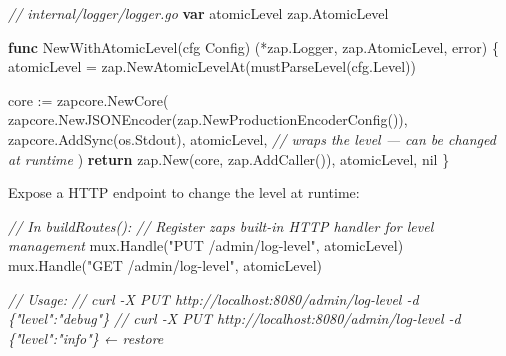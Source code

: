 \documentclass[
]{article}
\newenvironment{Shaded}{}{}
\newcommand{\CommentTok}[1]{\textcolor[rgb]{0.38,0.63,0.69}{\textit{#1}}}
\newcommand{\ControlFlowTok}[1]{\textcolor[rgb]{0.00,0.44,0.13}{\textbf{#1}}}
\newcommand{\DataTypeTok}[1]{\textcolor[rgb]{0.56,0.13,0.00}{#1}}
\newcommand{\KeywordTok}[1]{\textcolor[rgb]{0.00,0.44,0.13}{\textbf{#1}}}
\newcommand{\NormalTok}[1]{#1}
\newcommand{\OperatorTok}[1]{\textcolor[rgb]{0.40,0.40,0.40}{#1}}
\newcommand{\OtherTok}[1]{\textcolor[rgb]{0.00,0.44,0.13}{#1}}
\newcommand{\StringTok}[1]{\textcolor[rgb]{0.25,0.44,0.63}{#1}}
\begin{document}
\begin{Shaded}
\begin{Highlighting}[]
\CommentTok{// internal/logger/logger.go}
\KeywordTok{var}\NormalTok{ atomicLevel zap}\OperatorTok{.}\NormalTok{AtomicLevel}

\KeywordTok{func}\NormalTok{ NewWithAtomicLevel}\OperatorTok{(}\NormalTok{cfg Config}\OperatorTok{)} \OperatorTok{(*}\NormalTok{zap}\OperatorTok{.}\NormalTok{Logger}\OperatorTok{,}\NormalTok{ zap}\OperatorTok{.}\NormalTok{AtomicLevel}\OperatorTok{,} \DataTypeTok{error}\OperatorTok{)} \OperatorTok{\{}
\NormalTok{    atomicLevel }\OperatorTok{=}\NormalTok{ zap}\OperatorTok{.}\NormalTok{NewAtomicLevelAt}\OperatorTok{(}\NormalTok{mustParseLevel}\OperatorTok{(}\NormalTok{cfg}\OperatorTok{.}\NormalTok{Level}\OperatorTok{))}

\NormalTok{    core }\OperatorTok{:=}\NormalTok{ zapcore}\OperatorTok{.}\NormalTok{NewCore}\OperatorTok{(}
\NormalTok{        zapcore}\OperatorTok{.}\NormalTok{NewJSONEncoder}\OperatorTok{(}\NormalTok{zap}\OperatorTok{.}\NormalTok{NewProductionEncoderConfig}\OperatorTok{()),}
\NormalTok{        zapcore}\OperatorTok{.}\NormalTok{AddSync}\OperatorTok{(}\NormalTok{os}\OperatorTok{.}\NormalTok{Stdout}\OperatorTok{),}
\NormalTok{        atomicLevel}\OperatorTok{,} \CommentTok{// wraps the level — can be changed at runtime}
    \OperatorTok{)}
    \ControlFlowTok{return}\NormalTok{ zap}\OperatorTok{.}\NormalTok{New}\OperatorTok{(}\NormalTok{core}\OperatorTok{,}\NormalTok{ zap}\OperatorTok{.}\NormalTok{AddCaller}\OperatorTok{()),}\NormalTok{ atomicLevel}\OperatorTok{,} \OtherTok{nil}
\OperatorTok{\}}
\end{Highlighting}
\end{Shaded}

Expose a HTTP endpoint to change the level at runtime:

\begin{Shaded}
\begin{Highlighting}[]
\CommentTok{// In buildRoutes():}
\CommentTok{// Register zap\textquotesingle{}s built{-}in HTTP handler for level management}
\NormalTok{mux}\OperatorTok{.}\NormalTok{Handle}\OperatorTok{(}\StringTok{"PUT /admin/log{-}level"}\OperatorTok{,}\NormalTok{ atomicLevel}\OperatorTok{)}
\NormalTok{mux}\OperatorTok{.}\NormalTok{Handle}\OperatorTok{(}\StringTok{"GET /admin/log{-}level"}\OperatorTok{,}\NormalTok{ atomicLevel}\OperatorTok{)}

\CommentTok{// Usage:}
\CommentTok{// curl {-}X PUT http://localhost:8080/admin/log{-}level {-}d \textquotesingle{}\{"level":"debug"\}\textquotesingle{}}
\CommentTok{// curl {-}X PUT http://localhost:8080/admin/log{-}level {-}d \textquotesingle{}\{"level":"info"\}\textquotesingle{}  ← restore}
\end{Highlighting}
\end{Shaded}
\end{document}
